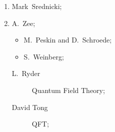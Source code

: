 \begin{texcode}[breaklines = true, emph={[1]enumerate,itemize,description}, moretexcs={\arabic*}]
\begin{enumerate}[label=(\arabic*).]
\item Mark~Srednicki;
\item A.~Zee;
    \begin{itemize}
        \item M.~Peskin and D.~Schroede;
        \item S.~Weinberg;
    \end{itemize}
    \begin{description}
        \item [L.~Ryder] Quantum Field Theory;
        \item [David Tong] QFT;
    \end{description}
\end{enumerate}
\end{texcode}